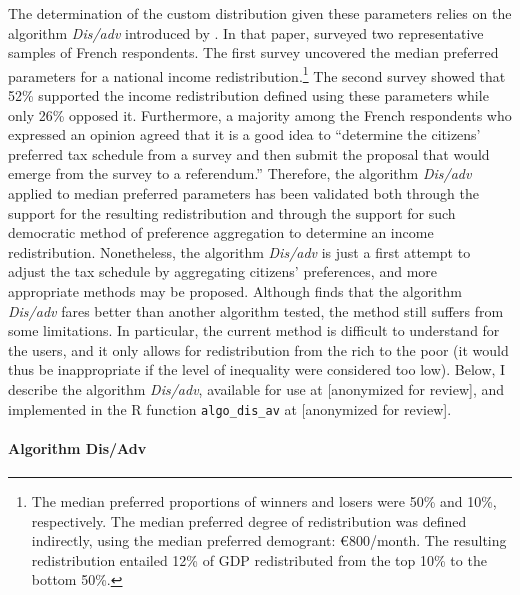 The determination of the custom distribution given these parameters relies on the algorithm \textit{Dis/adv} introduced by \cite{fabre_french_2022}. In that paper, \cite{fabre_french_2022} surveyed two representative samples of French respondents. The first survey uncovered the median preferred parameters for a national income redistribution.\footnote{The median preferred proportions of winners and losers were 50\% and 10\%, respectively. The median preferred degree of redistribution was defined indirectly, using the median preferred demogrant: \euro{}800/month. The resulting redistribution entailed 12\% of GDP redistributed from the top 10\% to the bottom 50\%.} The second survey showed that 52\% supported the income redistribution defined using these parameters while only 26\% opposed it. Furthermore, a majority among the French respondents who expressed an opinion agreed that it is a good idea to ``determine the citizens' preferred tax schedule from a survey and then submit the proposal that would emerge from the survey to a referendum.'' Therefore, the algorithm \textit{Dis/adv} applied to median preferred parameters has been validated both through the support for the resulting redistribution and through the support for such democratic method of preference aggregation to determine an income redistribution. Nonetheless, the algorithm \textit{Dis/adv} is just a first attempt to adjust the tax schedule by aggregating citizens' preferences, and more appropriate methods may be proposed. Although \cite{fabre_french_2022} finds that the algorithm \textit{Dis/adv} fares better than another algorithm tested, the method still suffers from some limitations. In particular, the current method is difficult to understand for the users, and it only allows for redistribution from the rich to the poor (it would thus be inappropriate if the level of inequality were considered too low). Below, I describe the algorithm \textit{Dis/adv}, available for use at [anonymized for review], %
and implemented in the R function \verb|algo_dis_av| at [anonymized for review]. %

\paragraph{Algorithm Dis/Adv} 

